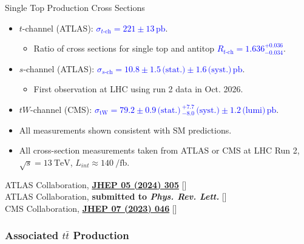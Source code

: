 \documentclass{beamer}
\begin{document}
\begin{frame}{Single Top Production Cross Sections}
  \begin{itemize}
    \item $t$-channel (ATLAS): \textcolor{blue}{$\sigma_{\text{$t$-ch}} = 221 \pm 13\,\unit{\pico\barn}$}.
    \begin{itemize}
      \item Ratio of cross sections for single top and antitop \textcolor{blue}{$R_{\text{$t$-ch}} = 1.636 {}^{+0.036}_{-0.034}$}.
    \end{itemize}
    \item $s$-channel (ATLAS): \textcolor{blue}{$\sigma_{\text{$s$-ch}} = 10.8 \pm 1.5\,\text{(stat.)} \pm 1.6\,\text{(syst.)}\,\unit{\pico\barn}$}.
    \begin{itemize}
      \item First observation at LHC using run 2 data in Oct. 2026.
    \end{itemize}
    \item $tW$-channel (CMS): \textcolor{blue}{$\sigma_{\text{tW}} = 79.2 \pm 0.9\,\text{(stat.)}\,^{+7.7}_{-8.0}\,\text{(syst.)} \allowbreak \pm 1.2\,\text{(lumi)}\,\unit{\pico\barn}$}.
    \item All measurements shown consistent with SM predictions.
    \item All cross-section measurements taken from ATLAS or CMS at LHC Run 2, $\sqrt{s} = \qty{13}{\tera\electronvolt}$, $L_{int} \approx \qty{140}{\per\femto\barn}$.
  \end{itemize}
  {\tiny \color{gray} ATLAS Collaboration, \textbf{\href{https://doi.org/10.1007/JHEP05(2024)305}{JHEP 05 (2024) 305}} [\href{https://arxiv.org/abs/2403.02126v3}{}]} \\
  {\tiny \color{gray} ATLAS Collaboration, \textbf{submitted to \textit{Phys. Rev. Lett.}} [\href{https://arxiv.org/abs/2610.11465v1}{}]} \\
  {\tiny \color{gray} CMS Collaboration, \textbf{\href{https://doi.org/10.1007/JHEP07(2023)046}{JHEP 07 (2023) 046}} [\href{https://arxiv.org/abs/2208.00924}{}]}
\end{frame}

\subsubsection{Associated $t\bar{t}$ Production}
\end{document}
